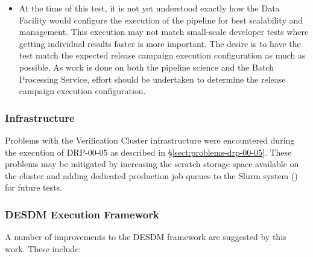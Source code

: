 \documentclass[DM,STR,toc]{lsstdoc}
\begin{document}
\begin{itemize}
  \item{
    At the time of this test, it is not yet understood exactly how the Data Facility would configure the execution of the pipeline for best scalability and management.
    This execution may not match small-scale developer tests where getting individual results faster is more important.
    The desire is to have the test match the expected release campaign execution configuration
  as much as possible.
    As work is done on both the pipeline science and the Batch Processing Service, effort should be undertaken to determine the release campaign execution configuration.
  }

\end{itemize}

\subsubsection{Infrastructure}

Problems with the Verification Cluster infrastructure were encountered during the execution of DRP-00-05 as described in \S\ref{sect:problems-drp-00-05}.
These problems may be mitigated by increasing the scratch storage space available on the cluster and adding dedicated production job queues to the Slurm system () for future tests.

\subsubsection{DESDM Execution Framework}

A number of improvements to the DESDM framework are suggested by this work.
These include:
\end{document}
